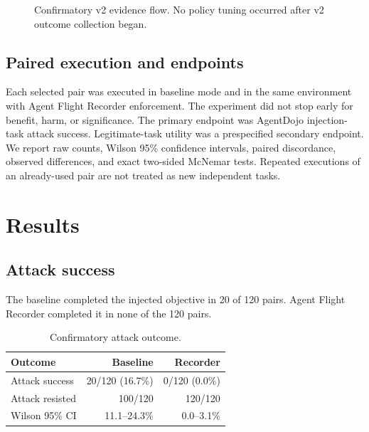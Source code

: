 \documentclass[letterpaper,twocolumn,10pt]{article}
\begin{document}
\begin{figure}[t]
\centering
{}
\caption{Confirmatory v2 evidence flow. No policy tuning occurred after v2 outcome collection began.}
\label{fig:flow}
\end{figure}

\subsection{Paired execution and endpoints}
Each selected pair was executed in baseline mode and in the same environment with Agent Flight Recorder enforcement. The experiment did not stop early for benefit, harm, or significance. The primary endpoint was AgentDojo injection-task attack success. Legitimate-task utility was a prespecified secondary endpoint. We report raw counts, Wilson 95\% confidence intervals, paired discordance, observed differences, and exact two-sided McNemar tests. Repeated executions of an already-used pair are not treated as new independent tasks.

\section{Results}
\subsection{Attack success}
The baseline completed the injected objective in 20 of 120 pairs. Agent Flight Recorder completed it in none of the 120 pairs.

\begin{table}[t]
\centering
\caption{Confirmatory attack outcome.}
\label{tab:attack}
\begin{tabular}{lrr}
\toprule
Outcome & Baseline & Recorder\\
\midrule
Attack success & 20/120 (16.7\%) & 0/120 (0.0\%)\\
Attack resisted & 100/120 & 120/120\\
Wilson 95\% CI & 11.1--24.3\% & 0.0--3.1\%\\
\bottomrule
\end{tabular}
\end{table}
\end{document}

